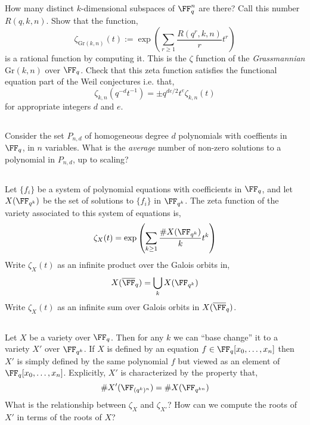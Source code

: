 \documentclass[12pt]{article}
\begin{document}
\subsection{}

\newcommand{\Gr}{\mathrm{Gr}}

How many distinct $k$-dimensional subspaces of $\FF^n_q$ are there? Call this number $R(q, k, n)$. Show that the function,
\[ \zeta_{\Gr(k,n)}(t) := \exp{\left( \sum_{r \ge 1} \frac{R(q^r, k, n)}{r} t^r \right) }\]
is a rational function by computing it. This is the $\zeta$ function of the \textit{Grassmannian} $\Gr(k, n)$ over $\FF_q$. Check that this zeta function satisfies the functional equation part of the Weil conjectures i.e. that,
\[ \zeta_{k,n}(q^{-d} t^{-1}) = \pm q^{de/2} t^e \zeta_{k,n}(t) \]
for appropriate integers $d$ and $e$.

\subsection{}

Consider the set $P_{n,d}$ of homogeneous degree $d$ polynomials with coeffients in $\FF_q$, in $n$ variables. What is the \textit{average} number of non-zero solutions to a polynomial in $P_{n,d}$, up to scaling?

\subsection{}

Let $\{ f_i \}$ be a system of polynomial equations with coefficients in $\FF_q$, and let $X(\FF_{q^k})$ be the set of solutions to $\{ f_i \}$ in $\FF_{q^k}$. The zeta function of the variety associated to this system of equations is,
\[ \zeta_X(t) = \exp{\left( \sum_{k \ge 1} \frac{\# X(\FF_{q^k})}{k} t^k \right)}\]
Write $\zeta_X(t)$ as an infinite product over the Galois orbits in,
\[ X(\overline{\FF}_q) = \bigcup_k X(\FF_{q^k}) \]
Write $\zeta_X(t)$ as an infinite sum over Galois orbits in $X(\overline{\FF}_q)$.

\subsection{} \label{base_change}

Let $X$ be a variety over $\FF_q$. Then for any $k$ we can ``base change'' it to a variety $X'$ over $\FF_{q^k}$. If $X$ is defined by an equation $f \in \FF_q[x_0, \dots, x_n]$ then $X'$ is simply defined by the same polynomial $f$ but viewed as an element of $\FF_q[x_0, \dots, x_n]$. Explicitly, $X'$ is characterized by the property that,
\[ \# X'(\FF_{(q^k)^n}) = \# X(\FF_{q^{kn}}) \]
What is the relationship between $\zeta_X$ and $\zeta_{X'}$? How can we compute the roots of $X'$ in terms of the roots of $X$?
\end{document}
